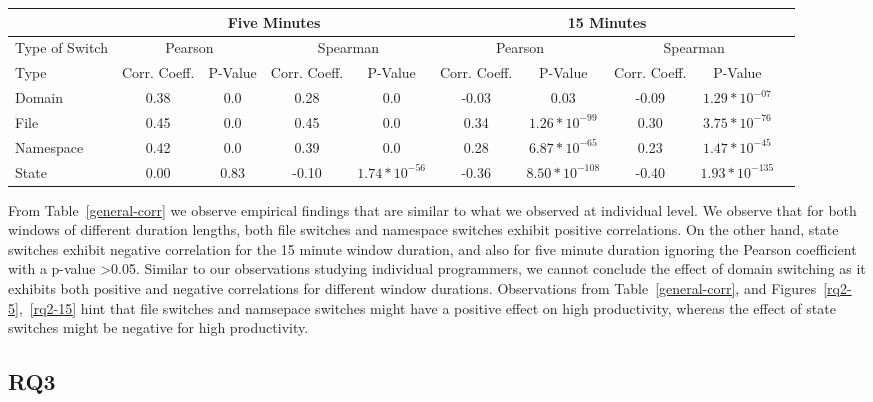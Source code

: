 \begin{table*}[htp]
\caption{What are the effects of different types of context switches on high productivity?}
\label{general-corr}
\small
\begin{tabular}{|p{1.7cm}|c|c|c|c|c|c|c|c|c|}
  \hline
   & \multicolumn{4}{c|}{Five Minutes}  &  \multicolumn{4}{c|}{15 Minutes} \\
  \hline
  Type of Switch & \multicolumn{2}{c|}{Pearson}  &  \multicolumn{2}{c|}{Spearman} & \multicolumn{2}{c|}{Pearson}  &  \multicolumn{2}{c|}{Spearman} \\
  \hline
  Type & Corr. Coeff. & P-Value & Corr. Coeff. & P-Value & Corr. Coeff. & P-Value & Corr. Coeff. & P-Value \\
  \hline
  Domain  & 0.38 & 0.0 & 0.28 & 0.0 &  -0.03 & 0.03 & -0.09 & $1.29*10^{-07}$  \\
  \hline
  File  & 0.45 & 0.0 & 0.45 & 0.0 & 0.34 & $1.26*10^{-99}$ & 0.30  & $3.75*10^{-76}$  \\
  \hline
  Namespace  & 0.42 & 0.0 & 0.39 & 0.0 & 0.28 & $6.87*10^{-65}$ & 0.23 & $1.47*10^{-45}$  \\
  \hline
  State  & 0.00 & 0.83 & -0.10 & $1.74*10^{-56}$ & -0.36 &  $8.50*10^{-108}$ & -0.40 & $1.93*10^{-135}$  \\
  \hline
  \hline
  \end{tabular}
\end{table*}

From Table~\ref{general-corr} we observe empirical findings that are similar to what we observed at individual level. We observe that for both windows of different duration lengths, both file switches and namespace switches 
exhibit positive correlations. On the other hand, state switches exhibit negative correlation for the 15 minute window duration, and also for five minute duration ignoring the Pearson coefficient with a p-value >0.05. Similar to our observations studying individual programmers, we cannot conclude the effect of domain switching as it exhibits both positive and negative correlations for different window durations. Observations from Table~\ref{general-corr}, and Figures~\ref{rq2-5},~\ref{rq2-15} hint that file switches and namsepace switches might have a positive effect on high productivity, whereas the effect of state switches might be negative for high productivity.          



\subsection{RQ3}

